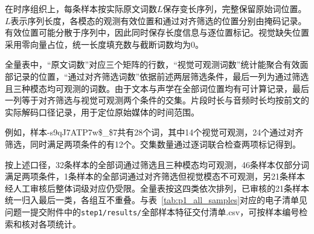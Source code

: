 在时序组织上，每条样本按实际原文词数$L$保存变长序列，完整保留原始词位置。$L$表示序列长度，各模态的观测有效位置和通过对齐筛选的位置分别由掩码记录。有效位置可能分散于序列中，因此同时保存长度信息与逐位置标记。视觉缺失位置采用零向量占位，统一长度填充数与截断词数均为0。

全量表中，“原文词数”对应三个矩阵的行数，“视觉可观测词数”统计能聚合有效面部记录的位置，“通过对齐筛选词数”依据前述两层筛选条件，最后一列为通过筛选且三种模态均可观测的词数。由于文本与声学在全部词位置均有可计算记录，最后一列等于对齐筛选与视觉可观测两个条件的交集。片段时长与音频时长均按前文的实际解码口径记录，用于定位原始媒体的时间范围。

例如，样本-s9qJ7ATP7w\$\_\$7共有28个词，其中14个视觉可观测，24个通过对齐筛选，同时满足两项条件的有12个。交集数量通过逐词联合检查两项标记得到。

按上述口径，32条样本的全部词通过筛选且三种模态均可观测，46条样本仅部分词满足两项条件，1条样本的全部词通过对齐筛选但视觉模态不可观测，另21条样本经人工审核后整体词级对应仍受限。全量表按这四类依次排列，已审核的21条样本统一归入最后一类，各组互不重叠。与表~\ref{tab:p1_all_samples}对应的电子清单见问题一提交附件中的\nolinkurl{step1/results/}\textnormal{全部样本特征交付清单.csv}，可按样本编号检索和核对各项统计。

